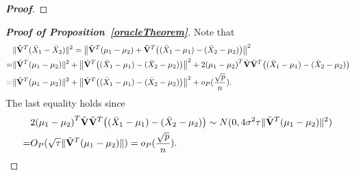 \documentclass[review]{elsarticle}
\theoremstyle{plain}
\theoremstyle{definition}
\theoremstyle{remark}
\begin{document}
\begin{appendices}
\begin{proof}[\textbf{Proof}]
\end{proof}


\begin{proof}[\textbf{Proof of Proposition~\ref{oracleTheorem}}]
Note that
    \begin{equation}\label{qiguaile}
        \begin{aligned}
            &\|\tilde{\mathbf{V}}^T(\bar{X}_1-\bar{X}_2)\|^2
            =\big\|\tilde{\mathbf{V}}^T(\mu_1-\mu_2)+\tilde{\mathbf{V}}^T\big((\bar{X}_1-\mu_1)-(\bar{X}_2-\mu_2)\big)\big\|^2\\
            =&\|\tilde{\mathbf{V}}^T(\mu_1-\mu_2)\|^2+
            \big\|\tilde{\mathbf{V}}^T\big((\bar{X}_1-\mu_1)-(\bar{X}_2-\mu_2)\big)\big\|^2+
            2{(\mu_1-\mu_2)}^T\tilde{\mathbf{V}}\tilde{\mathbf{V}}^T\big((\bar{X}_1-\mu_1)-(\bar{X}_2-\mu_2)\big)\\
            =&\|\tilde{\mathbf{V}}^T(\mu_1-\mu_2)\|^2+
            \big\|\tilde{\mathbf{V}}^T\big((\bar{X}_1-\mu_1)-(\bar{X}_2-\mu_2)\big)\big\|^2+
            o_P(\frac{\sqrt{p}}{n}).
        \end{aligned}
    \end{equation}
    The last equality holds since
    \begin{equation*}
        \begin{aligned}
            &2{(\mu_1-\mu_2)}^T\tilde{\mathbf{V}}\tilde{\mathbf{V}}^T\big((\bar{X}_1-\mu_1)-(\bar{X}_2-\mu_2)\big)\sim N(0,4\sigma^2 \tau \|\tilde{\mathbf{V}}^T(\mu_1-\mu_2)\|^2)\\
            =& O_P(\sqrt{\tau}\|\tilde{\mathbf{V}}^T(\mu_1-\mu_2)\| )=o_P(\frac{\sqrt{p}}{n}).
        \end{aligned}
    \end{equation*}


\end{proof}
\end{appendices}
\end{document}
